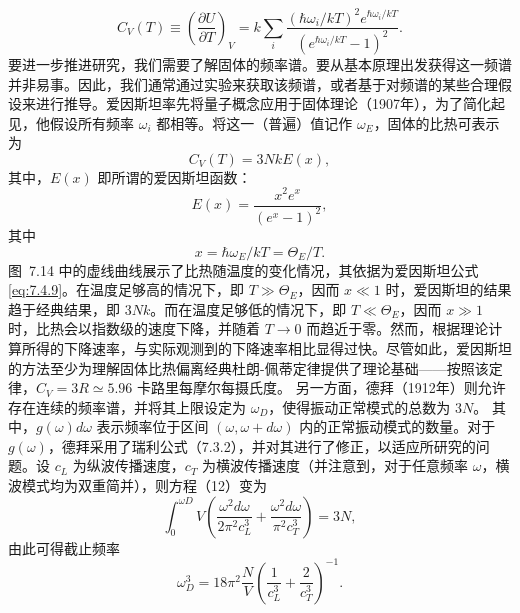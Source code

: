 \begin{equation}\tag{7.4.8}\label{eq:7.4.8}
C _ { V } ( T ) \equiv \left( \frac { \partial U } { \partial T } \right) _ { V } = k \sum _ { i } \frac { ( \hbar \omega _ { i } / k T ) ^{2} e ^{\hbar \omega _ { i} / k T } } { ( e ^{\hbar \omega _ { i} / k T } - 1 ) ^{2} } .
\end{equation}
要进一步推进研究，我们需要了解固体的频率谱。要从基本原理出发获得这一频谱并非易事。因此，我们通常通过实验来获取该频谱，或者基于对频谱的某些合理假设来进行推导。爱因斯坦率先将量子概念应用于固体理论（1907年），为了简化起见，他假设所有频率 \(\omega_{i}\) 都相等。将这一（普遍）值记作 \(\omega_{E}\)，固体的比热可表示为
\begin{equation}\tag{7.4.9}\label{eq:7.4.9}
C _ { V } ( T ) = 3 N k E ( x ) ,
\end{equation}
其中，\(E(x)\) 即所谓的爱因斯坦函数：
\begin{equation}\tag{7.4.10}\label{eq:7.4.10}
E ( x ) = \frac { x ^{2} e ^{x} } { ( e ^{x} - 1 ) ^{2} } ,
\end{equation}
其中
\begin{equation}\tag{7.4.11}\label{eq:7.4.11}
x = \hbar \omega _ { E } / k T = \Theta _ { E } / T .
\end{equation}
图~7.14 中的虚线曲线展示了比热随温度的变化情况，其依据为爱因斯坦公式\autoref{eq:7.4.9}。在温度足够高的情况下，即 \(T \gg \Theta_E\)，因而 \(x \ll 1\) 时，爱因斯坦的结果趋于经典结果，即 \(3Nk\)。而在温度足够低的情况下，即 \(T \ll \Theta_E\)，因而 \(x \gg 1\) 时，比热会以指数级的速度下降，并随着 \(T \to 0\) 而趋近于零。然而，根据理论计算所得的下降速率，与实际观测到的下降速率相比显得过快。尽管如此，爱因斯坦的方法至少为理解固体比热偏离经典杜朗-佩蒂定律提供了理论基础——按照该定律，\(C_V = 3R \simeq 5.96\) 卡路里每摩尔每摄氏度。
另一方面，德拜（1912年）则允许存在连续的频率谱，并将其上限设定为 \(\omega_{D}\)，使得振动正常模式的总数为 \(3N\)。
其中，\(g(\omega)d\omega\) 表示频率位于区间 \((\omega, \omega + d\omega)\) 内的正常振动模式的数量。对于 \(g(\omega)\)，德拜采用了瑞利公式（7.3.2），并对其进行了修正，以适应所研究的问题。设 \(c_L\) 为纵波传播速度，\(c_T\) 为横波传播速度（并注意到，对于任意频率 \(\omega\)，横波模式均为双重简并），则方程（12）变为
\begin{equation}\tag{7.4.12}\label{eq:7.4.12}
\int _ { 0 } ^{\omega D} V \left( \frac { \omega ^{2} d \omega } { 2 \pi ^{2} c _ { L } ^{3} } + \frac { \omega ^{2} d \omega } { \pi ^{2} c _ { T } ^{3} } \right) = 3 N ,
\end{equation}
由此可得截止频率
\begin{equation}\tag{7.4.13}\label{eq:7.4.13}
\omega _ { D } ^{3} = 18 \pi ^{2} \frac { N } { V } \left( \frac { 1 } { c _ { L } ^{3} } + \frac { 2 } { c _ { T } ^{3} } \right) ^{- 1} .
\end{equation}
